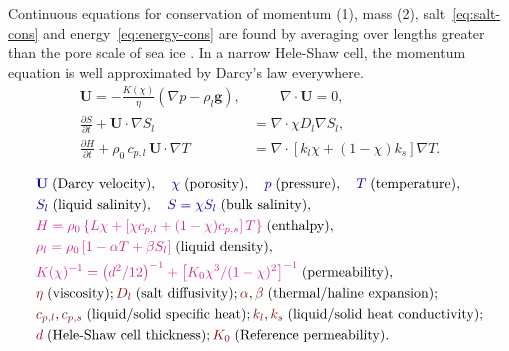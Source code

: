 \documentclass[landscape,24pt, a0paper,colspace=8mm,blockverticalspace=8mm]{tikzposter}
\newcommand{\varColor}[1]{\textcolor{dukeblue}{#1}}
\newcommand{\eqnColor}[1]{\textcolor{royalfuchsia}{#1}}
\newcommand{\paramColor}[1]{\textcolor{falured}{#1}}
\begin{document}
\begin{columns}
\begin{subcolumns}
{\begin{minipage}[t]{0.49\linewidth}
Continuous equations for conservation of momentum (1), mass (2), salt~\eqref{eq:salt-cons} and energy~\eqref{eq:energy-cons} are found by averaging over lengths greater than the pore scale of sea ice \cite{Worster1991,LeBars2006}. In a narrow Hele-Shaw cell, the momentum equation is well approximated by Darcy's law everywhere. 
\vspace{0.2em}
\begin{align}
     \mathbf{U} = -\frac{K(\chi)}{\eta} \left(\nabla p - \rho_l \mathbf{g} \right), & \quad \quad   \nabla \cdot \mathbf{U} = 0, \tag{1, 2}  \\
    \frac{\partial S}{\partial t} + \mathbf{U} \cdot \nabla S_l &= \nabla \cdot \chi D_l \nabla S_l, \label{eq:salt-cons} \tag{3} \\
    \frac{\partial H}{\partial t} + \rho_0 \, c_{p,l} \, \mathbf{U} \cdot \nabla  T &= \nabla \cdot \left[ k_l \chi + (1-\chi) k_s \right] \nabla T . \label{eq:energy-cons} \tag{4}
\end{align} 
\end{minipage}
\hfill
\begin{minipage}[t][][b]{0.48\linewidth}
\vspace{-1.0\baselineskip}
\begin{align*}
&\varColor{\mathbf{U}}\; \text{(Darcy velocity)}, \quad \varColor{\chi} \; \text{(porosity)}, \quad \varColor{p} \; \text{(pressure)}, \quad \varColor{T} \; \text{(temperature)},\\
&\varColor{S_l} \; \text{(liquid salinity)}, \quad \varColor{S = \chi S_l} \; \text{(bulk salinity)},  \\
&\eqnColor{H = \rho_0 \left\{ L \chi + \left[\chi c_{p,l} + (1-\chi) c_{p,s}\right] T \right\}} \; \text{(enthalpy)}, \\
&\eqnColor{\rho_l = \rho_0 \left[1 - \alpha T + \beta S_l \right]} \; \text{(liquid density)}, \\
&\eqnColor{K(\chi)^{-1} = \left(d^2/12\right)^{-1} + \left[K_0 \chi^3 / (1-\chi)^2 \right]^{-1}} \; \text{(permeability)}, \\
&\paramColor{\eta} \; \text{(viscosity)}; \paramColor{D_l} \; \text{(salt diffusivity)}; \paramColor{\alpha}, \paramColor{\beta} \; \text{(thermal/haline expansion)}; \\
&\paramColor{c_{p,l}}, \paramColor{c_{p,s}} \; \text{(liquid/solid specific heat)}; \paramColor{k_l}, \paramColor{k_s} \; \text{(liquid/solid heat conductivity)}; \\
&\paramColor{d} \; \text{(Hele-Shaw cell thickness)}; \paramColor{K_0} \; \text{(Reference permeability)}.
\end{align*}
\end{minipage}

}
\end{subcolumns}
\end{columns}
\end{document}
